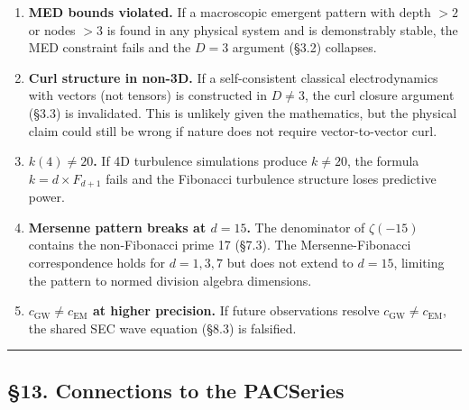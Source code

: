 \documentclass[
  11pt,
  a4paper]{article}
\begin{document}
\begin{enumerate}
\def\labelenumi{\arabic{enumi}.}
\item
  \textbf{MED bounds violated.} If a macroscopic emergent pattern with
  depth \(> 2\) or nodes \(> 3\) is found in any physical system and is
  demonstrably stable, the MED constraint fails and the \(D = 3\)
  argument (§3.2) collapses.
\item
  \textbf{Curl structure in non-3D.} If a self-consistent classical
  electrodynamics with vectors (not tensors) is constructed in
  \(D \neq 3\), the curl closure argument (§3.3) is invalidated. This is
  unlikely given the mathematics, but the physical claim could still be
  wrong if nature does not require vector-to-vector curl.
\item
  \textbf{\(k(4) \neq 20\).} If 4D turbulence simulations produce
  \(k \neq 20\), the formula \(k = d \times F_{d+1}\) fails and the
  Fibonacci turbulence structure loses predictive power.
\item
  \textbf{Mersenne pattern breaks at \(d = 15\).} The denominator of
  \(\zeta(-15)\) contains the non-Fibonacci prime 17 (§7.3). The
  Mersenne-Fibonacci correspondence holds for \(d = 1, 3, 7\) but does
  not extend to \(d = 15\), limiting the pattern to normed division
  algebra dimensions.
\item
  \textbf{\(c_\text{GW} \neq c_\text{EM}\) at higher precision.} If
  future observations resolve \(c_\text{GW} \neq c_\text{EM}\), the
  shared SEC wave equation (§8.3) is falsified.
\end{enumerate}

\begin{center}\rule{0.5\linewidth}{0.5pt}\end{center}

\subsection{§13. Connections to the
PACSeries}\label{connections-to-the-pacseries}
\end{document}
